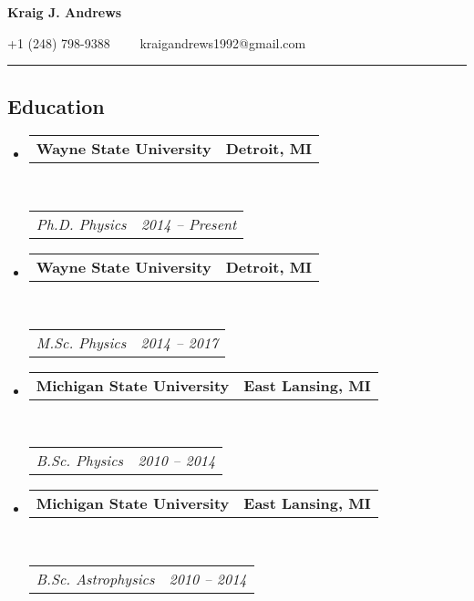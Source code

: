 \documentclass[10pt,letterpaper]{article}
\makeatletter
\newcommand{\headerrow}[2]
{\begin{tabular*}{\linewidth}{l@{\extracolsep{\fill}}r}
	#1 &
	#2 \\
\end{tabular*}}
\makeatother
\begin{document}
\begin{center}
{\LARGE \textbf{Kraig J. Andrews}}

+1 (248) 798-9388\ \ \textbullet
\ \ kraigandrews1992@gmail.com
\end{center}

\hrule
\vspace{-0.4em}
\subsection*{Education}

\begin{itemize}
	\parskip=0.1em

    \item 
    \headerrow
        {\textbf{Wayne State University}}
        {\textbf{Detroit, MI}}
    \\
    \headerrow
        {\emph{Ph.D. Physics}}
        {\emph{2014 -- Present}}
    
    \item 
    \headerrow
        {\textbf{Wayne State University}}
        {\textbf{Detroit, MI}}
    \\
    \headerrow
	{\emph{M.Sc. Physics}}
        {\emph{2014 -- 2017}}

	\item 
	\headerrow
	{\textbf{Michigan State University}}
	{\textbf{East Lansing, MI}}
	\\
	\headerrow
	{\emph{B.Sc. Physics}}
        {\emph{2010 -- 2014}}
    
    \item 
    \headerrow
        {\textbf{Michigan State University}}
        {\textbf{East Lansing, MI}}
    \\
    \headerrow
        {\emph{B.Sc. Astrophysics}}
        {\emph{2010 -- 2014}}

\end{itemize}
\end{document}
